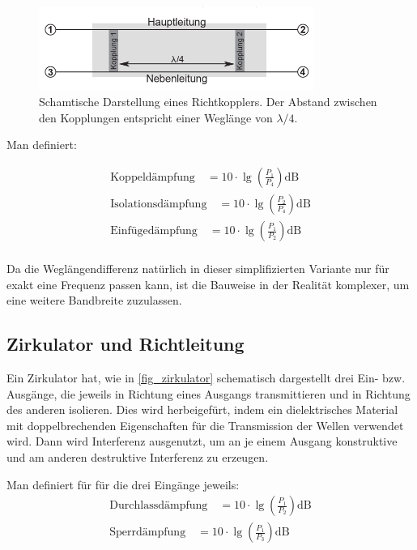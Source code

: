 \documentclass[
	a4paper,
	12pt,
	pagesize,
	ngerman
]{scrartcl}
\begin{document}
	\begin{figure}[H]
		\includegraphics[width=0.8\textwidth]{img/richtkoppler.png}
		\centering
		\caption{
			Schamtische Darstellung eines Richtkopplers. Der Abstand zwischen den Kopplungen entspricht einer Weglänge von $\lambda/4$. \cite{Anleitung}
		}
		\label{fig_richtkoppler}
		\centering
	\end{figure}

	Man definiert:

	\begin{align}
		\text{Koppeldämpfung} \quad = 10 \cdot \lg{ \left( \frac{P_1}{P_4} \right) } \si{\deci \bel}
		\label{eq_koppeld}\\
		\text{Isolationsdämpfung} \quad = 10 \cdot \lg{ \left( \frac{P_2}{P_4} \right) } \si{\deci \bel}
		\label{eq_isolation}\\
		\text{Einfügedämpfung} \quad = 10 \cdot \lg{ \left( \frac{P_1}{P_2} \right) } \si{\deci \bel}
		\label{eq_einfueged}\\
	\end{align}

	Da die Weglängendifferenz natürlich in dieser simplifizierten Variante nur für exakt eine Frequenz passen kann, ist die Bauweise in der Realität komplexer, um eine weitere Bandbreite zuzulassen.

	\subsection{Zirkulator und Richtleitung}

	Ein Zirkulator hat, wie in \cref{fig_zirkulator} schematisch dargestellt drei Ein- bzw. Ausgänge, die jeweils in Richtung eines Ausgangs transmittieren und in Richtung des anderen isolieren.
	Dies wird herbeigefürt, indem ein dielektrisches Material mit doppelbrechenden Eigenschaften für die Transmission der Wellen verwendet wird.
	Dann wird Interferenz ausgenutzt, um an je einem Ausgang konstruktive und am anderen destruktive Interferenz zu erzeugen.

	Man definiert für für die drei Eingänge jeweils:
	\begin{align}
		\text{Durchlassdämpfung} \quad = 10 \cdot \lg{ \left( \frac{P_1}{P_2} \right) } \si{\deci \bel}
		\label{eq_durchlassd}\\
		\text{Sperrdämpfung} \quad = 10 \cdot \lg{ \left( \frac{P_1}{P_3} \right) } \si{\deci \bel}
		\label{eq_sperrd}\\
	\end{align}
\end{document}
